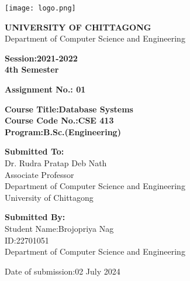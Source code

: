 \documentclass[a4paper,12pt]{article}
\begin{document}
\begin{titlepage}
    \centering
    \texttt{[image: logo.png]}\\ %

    \vspace*{0.5cm} %
    
    \Large\textbf{UNIVERSITY OF CHITTAGONG}\\
    \large Department of Computer Science and Engineering\\

    \vspace{1cm} %
    
    \textbf{Session:2021-2022}\\
    \textbf{4th Semester}\\
    
    \vspace{1cm} %
    
    \textbf{Assignment No.: 01}\\
    
    \vspace{0.5cm} %
    
    \textbf{Course Title:Database Systems}\\
    \textbf{Course Code No.:CSE 413}\\
    \textbf{Program:B.Sc.(Engineering)}\\
    
    \vspace{1cm} %
    
    \textbf{Submitted To:}\\
    Dr. Rudra Pratap Deb Nath\\
    Associate Professor\\
    Department of Computer Science and Engineering\\
    University of Chittagong\\
    
    \vspace{1cm} %
    
    \textbf{Submitted By:}\\
    Student Name:Brojopriya Nag\\
    ID:22701051\\
    Department of Computer Science and Engineering\\
    
    \vfill
    
    Date of submission:02 July 2024
    
\end{titlepage}
\end{document}
